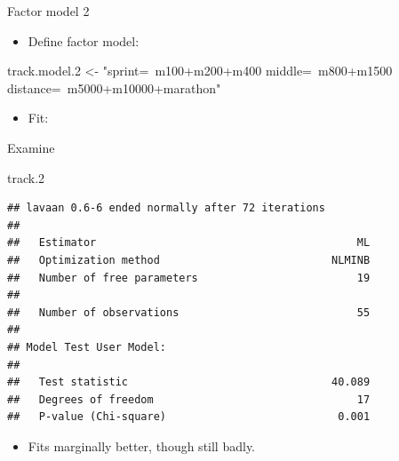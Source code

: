 \documentclass[
  ignorenonframetext,
]{beamer}
\newenvironment{Shaded}{\begin{snugshade}}{\end{snugshade}}
\newcommand{\DataTypeTok}[1]{\textcolor[rgb]{0.13,0.29,0.53}{#1}}
\newcommand{\FloatTok}[1]{\textcolor[rgb]{0.00,0.00,0.81}{#1}}
\newcommand{\KeywordTok}[1]{\textcolor[rgb]{0.13,0.29,0.53}{\textbf{#1}}}
\newcommand{\NormalTok}[1]{#1}
\newcommand{\OperatorTok}[1]{\textcolor[rgb]{0.81,0.36,0.00}{\textbf{#1}}}
\newcommand{\StringTok}[1]{\textcolor[rgb]{0.31,0.60,0.02}{#1}}
\providecommand{\tightlist}{%
  \setlength{\itemsep}{0pt}\setlength{\parskip}{0pt}}
\begin{document}
\begin{frame}[fragile]{Factor model 2}
\protect\hypertarget{factor-model-2}{}

\begin{itemize}
\tightlist
\item
  Define factor model:
\end{itemize}

\begin{Shaded}
\begin{Highlighting}[]
\NormalTok{track.model}\FloatTok{.2}\NormalTok{ <-}\StringTok{ "sprint=~m100+m200+m400}
\StringTok{                  middle=~m800+m1500}
\StringTok{                  distance=~m5000+m10000+marathon"}
\end{Highlighting}
\end{Shaded}

\begin{itemize}
\tightlist
\item
  Fit:
\end{itemize}

\begin{Shaded}
\end{Shaded}

\end{frame}

\begin{frame}[fragile]{Examine}
\protect\hypertarget{examine}{}

\begin{Shaded}
\begin{Highlighting}[]
\NormalTok{track}\FloatTok{.2}
\end{Highlighting}
\end{Shaded}

\begin{verbatim}
## lavaan 0.6-6 ended normally after 72 iterations
## 
##   Estimator                                         ML
##   Optimization method                           NLMINB
##   Number of free parameters                         19
##                                                       
##   Number of observations                            55
##                                                       
## Model Test User Model:
##                                                       
##   Test statistic                                40.089
##   Degrees of freedom                                17
##   P-value (Chi-square)                           0.001
\end{verbatim}

\begin{itemize}
\tightlist
\item
  Fits marginally better, though still badly.
\end{itemize}

\end{frame}
\end{document}
